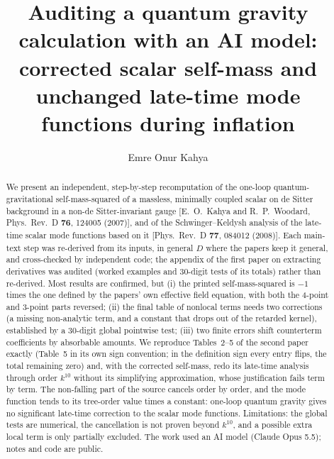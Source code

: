 \documentclass[aps,prd,onecolumn,10pt,nofootinbib,floatfix]{revtex4-2}
\begin{document}
\renewcommand{\thetable}{\arabic{table}}
\title{Auditing a quantum gravity calculation with an AI model: corrected scalar self-mass
and unchanged late-time mode functions during inflation}

\author{Emre Onur Kahya}

\begin{abstract}
We present an independent, step-by-step recomputation of the one-loop quantum-gravitational self-mass-squared of a massless,
minimally coupled scalar on de Sitter background in a non-de Sitter-invariant gauge [E.~O.~Kahya and R.~P.~Woodard, Phys.\ Rev.\ D
\textbf{76}, 124005 (2007)], and of the Schwinger--Keldysh analysis of the late-time scalar mode functions based on it [Phys.\ Rev.\ D
\textbf{77}, 084012 (2008)]. Each main-text step was re-derived from its inputs, in general $D$ where the papers keep it
general, and cross-checked by independent code; the appendix of the first paper on extracting derivatives was
audited (worked examples and 30-digit tests of its totals) rather than re-derived. Most results are confirmed, but
(i) the printed self-mass-squared is $-1$ times the one defined by the papers' own effective field equation, with both the
4-point and 3-point parts reversed; (ii) the final table of nonlocal terms needs two corrections (a missing non-analytic term, and
a constant that drops out of the retarded kernel), established by a 30-digit global pointwise test; (iii) two finite errors shift
counterterm coefficients by absorbable amounts. We reproduce Tables~2--5 of the second paper exactly (Table~5 in its own sign
convention; in the definition sign every entry flips, the total remaining zero) and, with the corrected self-mass, redo its late-time
analysis through order $k^{10}$ without its simplifying approximation, whose justification fails term by term. The
non-falling part of the source cancels order by order, and the mode function tends to its tree-order value times a constant: one-loop quantum gravity gives no
significant late-time correction to the scalar mode functions. Limitations: the global tests are numerical, the cancellation is not
proven beyond $k^{10}$, and a possible extra local term is only partially excluded. The work used an AI model (Claude Opus 5.5); notes
and code are public.
\end{abstract}

\maketitle
\end{document}
